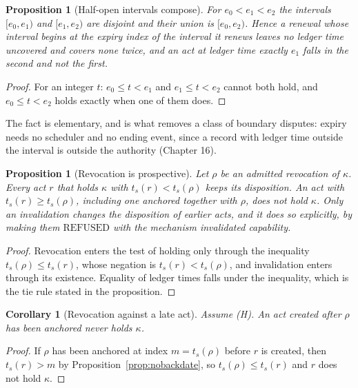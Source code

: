 \documentclass[11pt]{article}
\theoremstyle{plain}
\newtheorem{proposition}[theorem]{Proposition}
\newtheorem{corollary}[theorem]{Corollary}
\theoremstyle{definition}
\theoremstyle{remark}
\begin{document}
\begin{proposition}[Half-open intervals compose]\label{prop:halfopen}
For $e_0<e_1<e_2$ the intervals $[e_0,e_1)$ and $[e_1,e_2)$ are disjoint and their union is $[e_0,e_2)$. Hence a renewal whose interval begins at the expiry index of the interval it renews leaves no ledger time uncovered and covers none twice, and an act at ledger time exactly $e_1$ falls in the second and not the first.
\end{proposition}

\begin{proof}
For an integer $t$: $e_0\le t<e_1$ and $e_1\le t<e_2$ cannot both hold, and $e_0\le t<e_2$ holds exactly when one of them does.
\end{proof}

The fact is elementary, and is what removes a class of boundary disputes: expiry needs no scheduler and no ending event, since a record with ledger time outside the interval is outside the authority (Chapter 16).

\begin{proposition}[Revocation is prospective]\label{prop:revoke}
Let $\rho$ be an admitted revocation of $\kappa$. Every act $r$ that holds $\kappa$ with $t_s(r)<t_s(\rho)$ keeps its disposition. An act with $t_s(r)\ge t_s(\rho)$, including one anchored together with $\rho$, does not hold $\kappa$. Only an invalidation changes the disposition of earlier acts, and it does so explicitly, by making them $\mathrm{REFUSED}$ with the mechanism \textsf{invalidated capability}.
\end{proposition}

\begin{proof}
Revocation enters the test of holding only through the inequality $t_s(\rho)\le t_s(r)$, whose negation is $t_s(r)<t_s(\rho)$, and invalidation enters through its existence. Equality of ledger times falls under the inequality, which is the tie rule stated in the proposition.
\end{proof}

\begin{corollary}[Revocation against a late act]\label{cor:revlate}
Assume (H). An act created after $\rho$ has been anchored never holds $\kappa$.
\end{corollary}

\begin{proof}
If $\rho$ has been anchored at index $m=t_s(\rho)$ before $r$ is created, then $t_s(r)>m$ by Proposition~\ref{prop:nobackdate}, so $t_s(\rho)\le t_s(r)$ and $r$ does not hold $\kappa$.
\end{proof}
\end{document}

